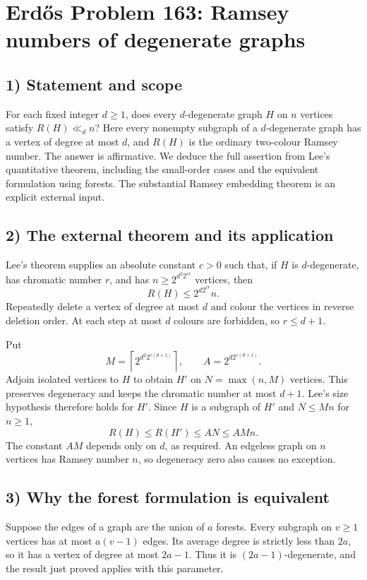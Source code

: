 \section{Erd\H{o}s Problem 163: Ramsey numbers of degenerate graphs}

\subsection{1) Statement and scope}
For each fixed integer $d\geq1$, does every $d$-degenerate graph $H$
on $n$ vertices satisfy $R(H)\ll_d n$? Here every nonempty subgraph
of a $d$-degenerate graph has a vertex of degree at most $d$, and $R(H)$
is the ordinary two-colour Ramsey number. The answer is affirmative.
We deduce the full assertion from Lee's quantitative theorem, including
the small-order cases and the equivalent formulation using forests.
The substantial Ramsey embedding theorem is an explicit external input.

\subsection{2) The external theorem and its application}
Lee's theorem supplies an absolute constant $c>0$ such that, if $H$ is
$d$-degenerate, has chromatic number $r$, and has
$n\geq 2^{d^2 2^{cr}}$ vertices, then
\[
 R(H)\leq 2^{d2^{cr}}n.
\]
Repeatedly delete a vertex of degree at most $d$ and colour the vertices
in reverse deletion order. At each step at most $d$ colours are forbidden,
so $r\leq d+1$.

Put
\[
 M=\left\lceil2^{d^2 2^{c(d+1)}}\right\rceil,
 \qquad A=2^{d2^{c(d+1)}}.
\]
Adjoin isolated vertices to $H$ to obtain $H'$ on $N=\max(n,M)$
vertices. This preserves degeneracy and keeps the chromatic number at
most $d+1$. Lee's size hypothesis therefore holds for $H'$. Since $H$
is a subgraph of $H'$ and $N\leq Mn$ for $n\geq1$,
\[
 R(H)\leq R(H')\leq AN\leq AMn.
\]
The constant $AM$ depends only on $d$, as required. An edgeless graph
on $n$ vertices has Ramsey number $n$, so degeneracy zero also causes
no exception.

\subsection{3) Why the forest formulation is equivalent}
Suppose the edges of a graph are the union of $a$ forests. Every subgraph
on $v\geq1$ vertices has at most $a(v-1)$ edges. Its average degree is
strictly less than $2a$, so it has a vertex of degree at most $2a-1$.
Thus it is $(2a-1)$-degenerate, and the result just proved applies with
this parameter.

